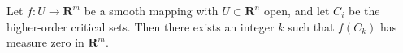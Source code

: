 Let $f: U \to \mathbf{R}^m$ be a smooth mapping with $U \subset \mathbf{R}^n$ open, and let $C_i$ be the higher-order critical sets. Then there exists an integer $k$ such that $f(C_k)$ has measure zero in $\mathbf{R}^m$.
